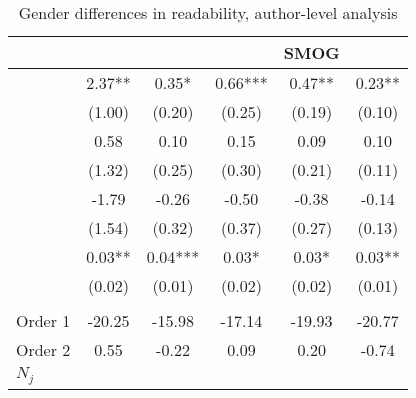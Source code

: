 \begin{table}
    \footnotesize
    \centering
    \begin{threeparttable}
        \caption{Gender differences in readability, author-level analysis}
        \label{table5}
        \begin{tabular}{p{4cm}S@{}S@{}S@{}S@{}S@{}}
            \toprule
            &{}&{}&{}&{SMOG}&{}\\
            \midrule
            &        2.37** &        0.35*  &        0.66***&        0.47** &        0.23** \\
                                          &      (1.00)   &      (0.20)   &      (0.25)   &      (0.19)   &      (0.10)   \\
            &        0.58   &        0.10   &        0.15   &        0.09   &        0.10   \\
                                          &      (1.32)   &      (0.25)   &      (0.30)   &      (0.21)   &      (0.11)   \\
             &       -1.79   &       -0.26   &       -0.50   &       -0.38   &       -0.14   \\
                                          &      (1.54)   &      (0.32)   &      (0.37)   &      (0.27)   &      (0.13)   \\
                  &        0.03** &        0.04***&        0.03*  &        0.03*  &        0.03** \\
                                          &      (0.02)   &      (0.01)   &      (0.02)   &      (0.02)   &      (0.01)   \\
             \\
            Order 1&      -20.25   &      -15.98   &      -17.14   &      -19.93   &      -20.77   \\
            Order 2                       &        0.55   &       -0.22   &        0.09   &        0.20   &       -0.74   \\
            \midrule
            \(N_j\)              &           {}   &           {}   &           {}   &           {}   &           {}   \\

\end{tabular}
\end{threeparttable}
\end{table}
